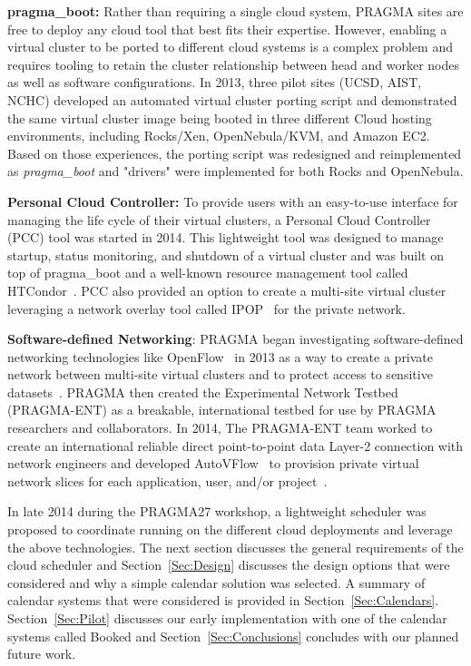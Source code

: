 \documentclass{acm_proc_article-sp}
\begin{document}
\textbf{pragma\_boot:}  Rather than requiring a single cloud system, PRAGMA sites are free to  deploy any cloud tool that best fits their expertise. However, enabling a virtual cluster to be ported to different cloud systems is a complex problem and requires tooling to retain the cluster relationship between head and worker nodes as well as software configurations.  In 2013, three pilot sites (UCSD, AIST, NCHC) developed an automated virtual cluster porting script and demonstrated the same virtual cluster image being booted in three different Cloud hosting environments, including Rocks/Xen, OpenNebula/KVM, and Amazon EC2.  Based on those experiences, the porting script was redesigned and reimplemented as \textit{pragma\_boot} and "drivers" were implemented for both Rocks and OpenNebula.

\textbf{Personal Cloud Controller:}  To provide users with an easy-to-use interface for managing the life cycle of their virtual clusters, a Personal Cloud Controller (PCC) tool was started in 2014. This lightweight tool was designed to manage startup,  status monitoring, and shutdown  of a virtual cluster and was built on top of pragma\_boot and a well-known resource management tool called HTCondor~\cite{condor}.   PCC also provided an option to create a multi-site virtual cluster leveraging a network overlay tool called IPOP~\cite{ipop} for the private network.

\textbf{Software-defined Networking}:   PRAGMA began investigating software-defined networking technologies like OpenFlow~\cite{openflow} in 2013 as a way to create a private network between multi-site virtual clusters and to protect access to sensitive datasets~\cite{pragmaReport2013}.  PRAGMA then created the Experimental Network Testbed (PRAGMA-ENT) as a breakable, international testbed for use by PRAGMA researchers and collaborators.  In 2014, The PRAGMA-ENT team worked to create an international reliable direct point-to-point data Layer-2 connection with network engineers and developed AutoVFlow~\cite{autovflow} to provision private virtual network slices for each application, user, and/or project~\cite{pragmaReport2014}.  

In late 2014 during the PRAGMA27 workshop, a lightweight scheduler was proposed to coordinate running on the different cloud deployments and leverage the above technologies.  The next section discusses the general requirements of the cloud scheduler and Section~\ref{Sec:Design} discusses the design options that were considered and why a simple calendar solution was selected.  A summary of calendar systems that were considered is provided in Section~\ref{Sec:Calendars}.  Section~\ref{Sec:Pilot} discusses our early implementation with one of the calendar systems called Booked and Section~\ref{Sec:Conclusions} concludes with our planned future work.  
\end{document}
